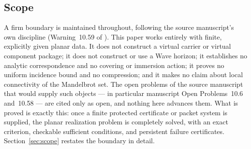 \subsection{Scope}\label{subsec:A-scope}

A firm boundary is maintained throughout, following the source manuscript's
own discipline (Warning~10.59 of \cite{MWman}).  This paper works entirely
with finite, explicitly given planar data.  It does not construct a virtual
carrier or virtual component package; it does not construct or use a Wave
horizon; it establishes no analytic correspondence and no covering or
immersion action; it proves no uniform incidence bound and no compression;
and it makes no claim about local connectivity of the Mandelbrot set.  The
open problems of the source manuscript that would supply such objects --- in
particular manuscript Open Problems~10.6 and~10.58 --- are cited only as
open, and nothing here advances them.  What is proved is exactly this: once
a finite protected certificate or packet system is supplied, the planar
realization problem is completely solved, with an exact criterion, checkable
sufficient conditions, and persistent failure certificates.
Section~\ref{sec:scope} restates the boundary in detail.
